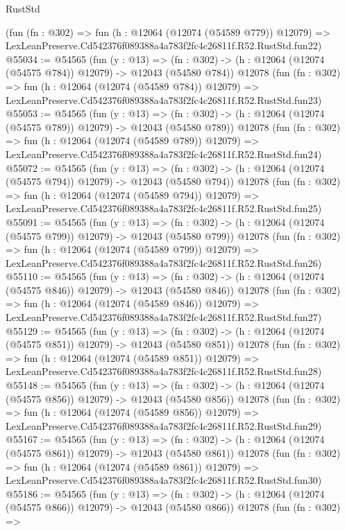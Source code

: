 \begin{lexlean}{RustStd}
\begin{coremodule}
    (fun (fn : @302) =>
    fun (h : @12064 (@12074 (@54589 @779)) @12079) =>
    LexLeanPreserve.Cd542376f089388a4a783f2fc4c26811f.R52.RustStd.fun22)
@55034 := @54565
    (fun (y : @13) =>
    (fn : @302) -> (h : @12064 (@12074 (@54575 @784)) @12079) -> @12043 (@54580 @784))
    @12078
    (fun (fn : @302) =>
    fun (h : @12064 (@12074 (@54589 @784)) @12079) =>
    LexLeanPreserve.Cd542376f089388a4a783f2fc4c26811f.R52.RustStd.fun23)
@55053 := @54565
    (fun (y : @13) =>
    (fn : @302) -> (h : @12064 (@12074 (@54575 @789)) @12079) -> @12043 (@54580 @789))
    @12078
    (fun (fn : @302) =>
    fun (h : @12064 (@12074 (@54589 @789)) @12079) =>
    LexLeanPreserve.Cd542376f089388a4a783f2fc4c26811f.R52.RustStd.fun24)
@55072 := @54565
    (fun (y : @13) =>
    (fn : @302) -> (h : @12064 (@12074 (@54575 @794)) @12079) -> @12043 (@54580 @794))
    @12078
    (fun (fn : @302) =>
    fun (h : @12064 (@12074 (@54589 @794)) @12079) =>
    LexLeanPreserve.Cd542376f089388a4a783f2fc4c26811f.R52.RustStd.fun25)
@55091 := @54565
    (fun (y : @13) =>
    (fn : @302) -> (h : @12064 (@12074 (@54575 @799)) @12079) -> @12043 (@54580 @799))
    @12078
    (fun (fn : @302) =>
    fun (h : @12064 (@12074 (@54589 @799)) @12079) =>
    LexLeanPreserve.Cd542376f089388a4a783f2fc4c26811f.R52.RustStd.fun26)
@55110 := @54565
    (fun (y : @13) =>
    (fn : @302) -> (h : @12064 (@12074 (@54575 @846)) @12079) -> @12043 (@54580 @846))
    @12078
    (fun (fn : @302) =>
    fun (h : @12064 (@12074 (@54589 @846)) @12079) =>
    LexLeanPreserve.Cd542376f089388a4a783f2fc4c26811f.R52.RustStd.fun27)
@55129 := @54565
    (fun (y : @13) =>
    (fn : @302) -> (h : @12064 (@12074 (@54575 @851)) @12079) -> @12043 (@54580 @851))
    @12078
    (fun (fn : @302) =>
    fun (h : @12064 (@12074 (@54589 @851)) @12079) =>
    LexLeanPreserve.Cd542376f089388a4a783f2fc4c26811f.R52.RustStd.fun28)
@55148 := @54565
    (fun (y : @13) =>
    (fn : @302) -> (h : @12064 (@12074 (@54575 @856)) @12079) -> @12043 (@54580 @856))
    @12078
    (fun (fn : @302) =>
    fun (h : @12064 (@12074 (@54589 @856)) @12079) =>
    LexLeanPreserve.Cd542376f089388a4a783f2fc4c26811f.R52.RustStd.fun29)
@55167 := @54565
    (fun (y : @13) =>
    (fn : @302) -> (h : @12064 (@12074 (@54575 @861)) @12079) -> @12043 (@54580 @861))
    @12078
    (fun (fn : @302) =>
    fun (h : @12064 (@12074 (@54589 @861)) @12079) =>
    LexLeanPreserve.Cd542376f089388a4a783f2fc4c26811f.R52.RustStd.fun30)
@55186 := @54565
    (fun (y : @13) =>
    (fn : @302) -> (h : @12064 (@12074 (@54575 @866)) @12079) -> @12043 (@54580 @866))
    @12078
    (fun (fn : @302) =>

\end{coremodule}
\end{lexlean}
